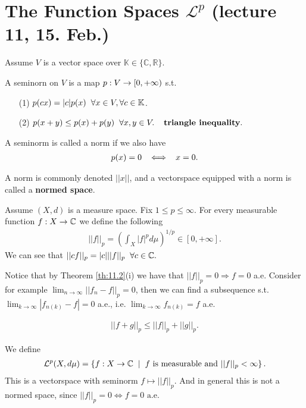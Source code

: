 \section{The Function Spaces $\mathcal{L}^p$ (lecture 11, 15. Feb.)}
Assume $V$ is a vector space over $\mathbb K\in\{\mathbb C,\mathbb R\}$.

\begin{definition}
    A seminorn on $V$ is a map $p:V\rightarrow [0,+\infty)$ s.t. 
    \begin{itemize}
        \item[(1)] $p(cx)=|c|p(x)\hspace{2mm} \forall x\in V,\forall c\in \mathbb K$.
        \item[(2)] $p(x+y)\leq p(x) +p(y)\hspace{2mm} \forall x,y\in V. \hspace{4mm} \textbf{triangle inequality}. $
    \end{itemize}
    A seminorm is called a norm if we also have \begin{align*}
        p(x)=0\hspace{2mm} \iff \hspace{2mm} x=0.
    \end{align*}
\end{definition}

A norm is commonly denoted $||x||$, and a vectorspace equipped with a norm is called a \textbf{normed space}.


\begin{definition}
    Assume $(X,d)$ is a measure space. Fix $1\leq p\leq \infty.$ For every measurable function $f:X\rightarrow \mathbb{C}$ we define the following
    \begin{align}
        ||f||_p = \left( \int_X |f|^p d\mu\right)^{1/p}\in [0,+\infty].
    \end{align} 
    We can see that $||cf||_p=|c|||f||_p\hspace{2mm} \forall c\in\mathbb{C}.$ 
    
    Notice that by Theorem \ref{th:11.2}(i) we have that \(||f||_p=0\Rightarrow 
    f=0\) a.e. Consider for example \(\lim_{n\rightarrow\infty}||f_n-f||_p=0\), then we can find a subsequence s.t. 
    \(\lim_{k\rightarrow\infty}|f_{n(k)}-f|=0\) a.e., i.e.
    \(\lim_{k\rightarrow\infty}f_{n(k)} = f\) a.e. 
\end{definition}

\begin{lemma}
    \begin{align}
        ||f+g||_p\leq ||f||_p+||g||_p.
    \end{align}
\end{lemma}

\begin{definition}
    We define
    \begin{align}
        \mathcal L^p(X,d\mu) = \left\{ f:X\rightarrow \mathbb{C}\hspace{2mm} |\hspace{2mm} f\text{ is measurable and } ||f||_p<\infty \right\}.    
    \end{align}
    This is a vectorspace with seminorm $f\mapsto ||f||_p.$
     And in general this is not a normed space, since $||f||_p=0 \iff f=0 \text{ a.e.}$
\end{definition}

